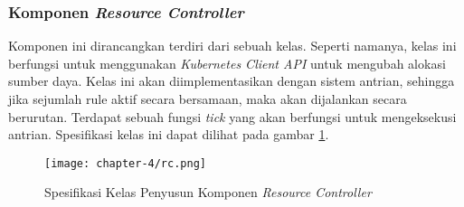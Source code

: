 \subsubsection{Komponen \textbf{\textit{Resource Controller}}}
Komponen ini dirancangkan terdiri dari sebuah kelas. Seperti namanya, kelas ini berfungsi untuk menggunakan \textit{Kubernetes Client API} untuk mengubah alokasi sumber daya. Kelas ini akan diimplementasikan dengan sistem antrian, sehingga jika sejumlah rule aktif secara bersamaan, maka akan dijalankan secara berurutan. Terdapat sebuah fungsi \textit{tick} yang akan berfungsi untuk mengeksekusi antrian. Spesifikasi kelas ini dapat dilihat pada gambar \ref{fig:rc-spek}.

\begin{figure}[h]
    \centering
    \texttt{[image: chapter-4/rc.png]}
    \caption{Spesifikasi Kelas Penyusun Komponen \textit{Resource Controller}}
    \label{fig:rc-spek}
\end{figure}